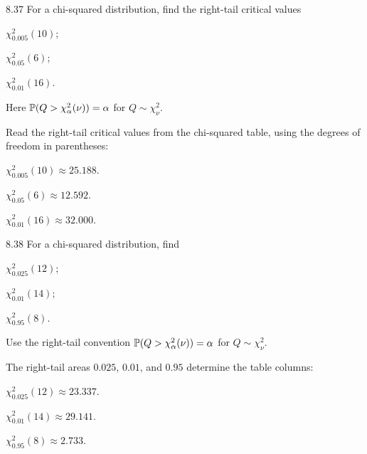 \documentclass[11pt,oneside]{article}
\begin{document}
\begin{exercise}{8.37}
For a chi-squared distribution, find the right-tail critical values
\begin{exercisesubparts}
\item $\chi^2_{0.005}(10)$;
\item $\chi^2_{0.05}(6)$;
\item $\chi^2_{0.01}(16)$.
\end{exercisesubparts}
Here $\mathbb{P}(Q>\chi^2_\alpha(\nu))=\alpha$ for $Q\sim\chi^2_\nu$.
\end{exercise}
\begin{solution}
Read the right-tail critical values from the chi-squared table, using the degrees of freedom in parentheses:
\begin{exercisesubparts}
\item $\boxed{\chi^2_{0.005}(10)\approx25.188}$.
\item $\boxed{\chi^2_{0.05}(6)\approx12.592}$.
\item $\boxed{\chi^2_{0.01}(16)\approx32.000}$.
\end{exercisesubparts}
\end{solution}

\begin{exercise}{8.38}
For a chi-squared distribution, find
\begin{exercisesubparts}
\item $\chi^2_{0.025}(12)$;
\item $\chi^2_{0.01}(14)$;
\item $\chi^2_{0.95}(8)$.
\end{exercisesubparts}
Use the right-tail convention $\mathbb{P}(Q>\chi^2_\alpha(\nu))=\alpha$ for $Q\sim\chi^2_\nu$.
\end{exercise}
\begin{solution}
The right-tail areas $0.025$, $0.01$, and $0.95$ determine the table columns:
\begin{exercisesubparts}
\item $\boxed{\chi^2_{0.025}(12)\approx23.337}$.
\item $\boxed{\chi^2_{0.01}(14)\approx29.141}$.
\item $\boxed{\chi^2_{0.95}(8)\approx2.733}$.
\end{exercisesubparts}
\end{solution}
\end{document}
